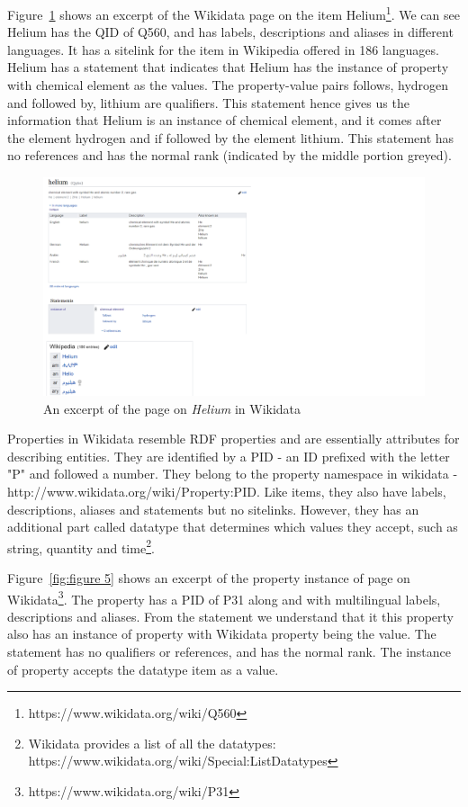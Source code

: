 Figure~\ref{fig:figure 4} shows an excerpt of the Wikidata page on the item Helium\footnote{https://www.wikidata.org/wiki/Q560}. We can see Helium has the QID of Q560, and has labels, descriptions and aliases in different languages. It has a sitelink for the item in Wikipedia offered in 186 languages. Helium has a statement that indicates that Helium has the instance of property with chemical element as the values. The property-value pairs follows, hydrogen and followed by, lithium are qualifiers. This statement hence gives us the information that Helium is an instance of chemical element, and it comes after the element hydrogen and if followed by the element lithium. This statement has no references and has the normal rank (indicated by the middle portion greyed).

\begin{figure}[h]
  \centering
  \includegraphics[width=0.75 \linewidth]{images/helium.pdf}
  \caption{An excerpt of the page on \textit{Helium} in Wikidata}
  \label{fig:figure 4}
\end{figure}

Properties in Wikidata resemble RDF properties and are essentially attributes for describing entities. They are identified by a PID - an ID prefixed with the letter "P" and followed a number. They belong to the property namespace in wikidata - http://www.wikidata.org/wiki/Property:PID. Like items, they also have labels, descriptions, aliases and statements but no sitelinks. However, they has an additional part called datatype that determines which values they accept, such as string, quantity and time\footnote{Wikidata provides a list of all the datatypes: https://www.wikidata.org/wiki/Special:ListDatatypes}.

Figure~\ref{fig:figure 5} shows an excerpt of the property instance of page on Wikidata\footnote{https://www.wikidata.org/wiki/P31}. The property has a PID of P31 along and with multilingual labels, descriptions and aliases. From the statement we understand that it this property also has an instance of property with Wikidata property being the value. The statement has no qualifiers or references, and has the normal rank. The instance of property accepts the datatype item as a value.

